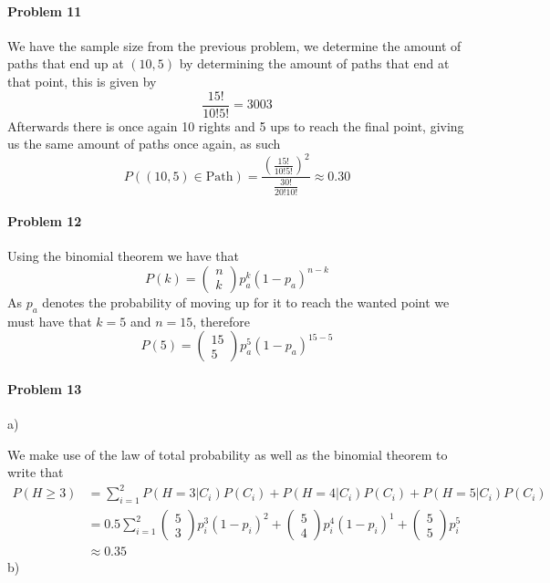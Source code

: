 \paragraph{Problem 11}
We have the sample size from the previous problem, we determine the amount of paths that end up at $(10,5)$ by determining the amount of paths that end at that point, this is given by
\[
    \frac{15!}{10!5!}=3003
\]
Afterwards there is once again 10 rights and 5 ups to reach the final point, giving us the same amount of paths once again, as such
\[
    P((10,5)\in \text{Path})=\frac{\left(\frac{15!}{10!5!}\right)^{2}}{\frac{30!}{20!10!}}\approx 0.30
\]
\paragraph{Problem 12}
Using the binomial theorem we have that
\[
    P(k)=\begin{pmatrix}n\\k\end{pmatrix}p_{a}^{k}(1-p_{a})^{n-k}
\]
As $p_{a}$ denotes the probability of moving up for it to reach the wanted point we must have that $k=5$ and $n=15$, therefore
\[
    P(5)=\begin{pmatrix}15\\5\end{pmatrix}p_{a}^{5}(1-p_{a})^{15-5}
\]
\paragraph{Problem 13}
a)

We make use of the law of total probability as well as the binomial theorem to write that
\begin{align*}
    P(H\geq 3)&=\sum_{i=1}^{2}P(H=3|C_{i})P(C_{i})+P(H=4|C_{i})P(C_{i})+P(H=5|C_{i})P(C_{i}) \\
           &=0.5\sum_{i=1}^{2}\begin{pmatrix}5\\3\end{pmatrix}p_{i}^{3}(1-p_{i})^{2}+\begin{pmatrix}5\\4\end{pmatrix}p_{i}^{4}(1-p_{i})^{1}+\begin{pmatrix}5\\5\end{pmatrix}p_{i}^{5} \\
           &\approx 0.35
\end{align*}
b)

